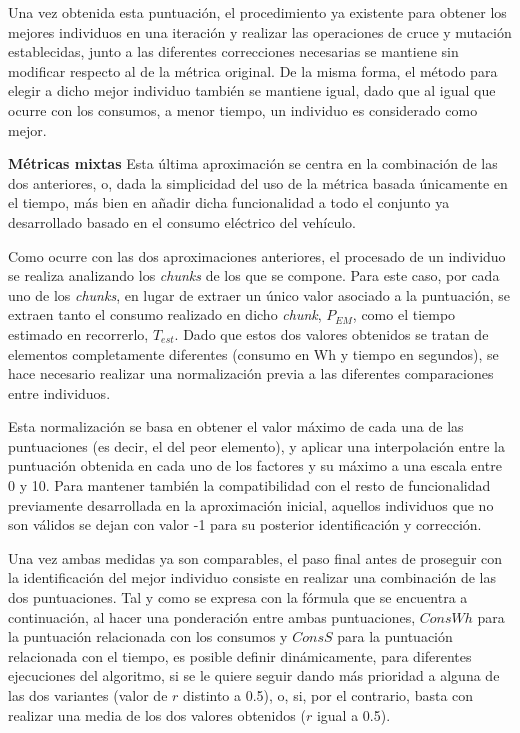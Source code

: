 \documentclass[11pt,spanish,listoffigures,listoftables]{tfgetsinf}
\begin{document}
Una vez obtenida esta puntuación, el procedimiento ya existente para obtener los mejores individuos en una iteración y realizar las operaciones de cruce y mutación establecidas, junto a las diferentes correcciones necesarias se mantiene sin modificar respecto al de la métrica original. De la misma forma, el método para elegir a dicho mejor individuo también se mantiene igual, dado que al igual que ocurre con los consumos, a menor tiempo, un individuo es considerado como mejor.\newline

\noindent\textbf{Métricas mixtas}\newline
Esta última aproximación se centra en la combinación de las dos anteriores, o, dada la simplicidad del uso de la métrica basada únicamente en el tiempo, más bien en añadir dicha funcionalidad a todo el conjunto ya desarrollado basado en el consumo eléctrico del vehículo.

Como ocurre con las dos aproximaciones anteriores, el procesado de un individuo se realiza analizando los \textit{chunks} de los que se compone. Para este caso, por cada uno de los \textit{chunks}, en lugar de extraer un único valor asociado a la puntuación, se extraen tanto el consumo realizado en dicho \textit{chunk}, $P_{EM}$, como el tiempo estimado en recorrerlo, $T_{est}$. Dado que estos dos valores obtenidos se tratan de elementos completamente diferentes (consumo en Wh y tiempo en segundos), se hace necesario realizar una normalización previa a las diferentes comparaciones entre individuos.

Esta normalización se basa en obtener el valor máximo de cada una de las puntuaciones (es decir, el del peor elemento), y aplicar una interpolación entre la puntuación obtenida en cada uno de los factores y su máximo a una escala entre 0 y 10. Para mantener también la compatibilidad con el resto de funcionalidad previamente desarrollada en la aproximación inicial, aquellos individuos que no son válidos se dejan con valor -1 para su posterior identificación y corrección.

Una vez ambas medidas ya son comparables, el paso final antes de proseguir con la identificación del mejor individuo consiste en realizar una combinación de las dos puntuaciones. Tal y como se expresa con la fórmula que se encuentra a continuación, al hacer una ponderación entre ambas puntuaciones, $ConsWh$ para la puntuación relacionada con los consumos y $ConsS$ para la puntuación relacionada con el tiempo, es posible definir dinámicamente, para diferentes ejecuciones del algoritmo, si se le quiere seguir dando más prioridad a alguna de las dos variantes (valor de $r$ distinto a 0.5), o, si, por el contrario, basta con realizar una media de los dos valores obtenidos ($r$ igual a 0.5).
\end{document}

